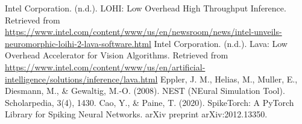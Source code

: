 \begin{thebibliography}{99}
	Intel Corporation. (n.d.). LOHI: Low Overhead High Throughput Inference. Retrieved from \url{https://www.intel.com/content/www/us/en/newsroom/news/intel-unveils-neuromorphic-loihi-2-lava-software.html}
	Intel Corporation. (n.d.). Lava: Low Overhead Accelerator for Vision Algorithms. Retrieved from \url{https://www.intel.com/content/www/us/en/artificial-intelligence/solutions/inference/lava.html}
	Eppler, J. M., Helias, M., Muller, E., Diesmann, M., \& Gewaltig, M.-O. (2008). NEST (NEural Simulation Tool). Scholarpedia, 3(4), 1430.
	Cao, Y., \& Paine, T. (2020). SpikeTorch: A PyTorch Library for Spiking Neural Networks. arXiv preprint arXiv:2012.13350.

\end{thebibliography}